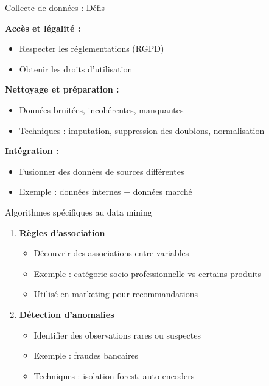 \begin{frame}{Collecte de données : Défis}

\textbf{Accès et légalité :}
\begin{itemize}
    \item Respecter les réglementations (RGPD)
    \item Obtenir les droits d'utilisation
\end{itemize}

\vspace{0.3cm}

\textbf{Nettoyage et préparation :}
\begin{itemize}
    \item Données bruitées, incohérentes, manquantes
    \item Techniques : imputation, suppression des doublons, normalisation
\end{itemize}

\vspace{0.3cm}

\textbf{Intégration :}
\begin{itemize}
    \item Fusionner des données de sources différentes
    \item Exemple : données internes + données marché
\end{itemize}

\end{frame}

\begin{frame}{Algorithmes spécifiques au data mining}

\begin{enumerate}
    \item<+-> \textbf{Règles d'association}
        \begin{itemize}
            \item Découvrir des associations entre variables
            \item Exemple : catégorie socio-professionnelle vs certains produits
            \item Utilisé en marketing pour recommandations
        \end{itemize}

    \vspace{0.3cm}
    \item<+-> \textbf{Détection d'anomalies}
        \begin{itemize}
            \item Identifier des observations rares ou suspectes
            \item Exemple : fraudes bancaires
            \item Techniques : isolation forest, auto-encoders
        \end{itemize}
\end{enumerate}

\end{frame}

